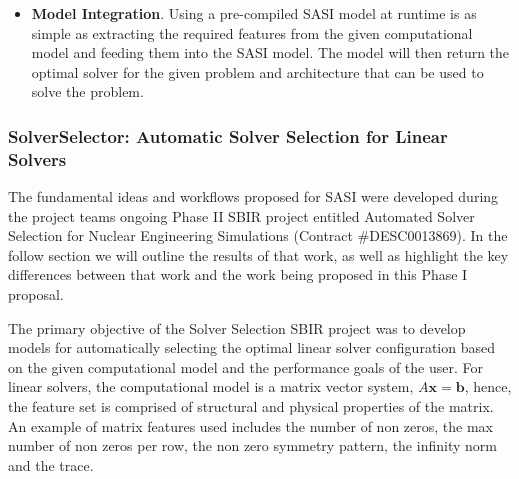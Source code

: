 \begin{itemize}
 \item { \bf Model Integration}. Using a pre-compiled SASI model at runtime is as simple as extracting the required features from the given computational model and feeding them into the SASI model. The model will then return the optimal solver for the given problem and architecture that can be used to solve the problem. 
\end{itemize}

\subsubsection{SolverSelector: Automatic Solver Selection for Linear Solvers} 
\label{sec:linearsolvers}

The fundamental ideas and workflows proposed for SASI were developed during the project teams ongoing Phase II SBIR project entitled Automated Solver Selection for Nuclear Engineering Simulations (Contract \#DESC0013869). In the follow section we will outline the results of that work, as well as highlight the key differences between that work and the work being proposed in this Phase I proposal.  

The primary objective of the Solver Selection SBIR project was to develop models for automatically selecting the optimal linear solver configuration based on the given computational model and the performance goals of the user. For linear solvers, the computational model is a matrix vector system, $A\mathbf{x} = \mathbf{b}$, hence, the feature set is comprised of structural and physical properties of the matrix. An example of matrix features used includes the number of non zeros, the max number of non zeros per row, the non zero symmetry pattern, the infinity norm and the trace.  

%

